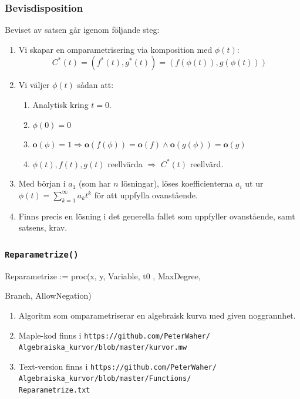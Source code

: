 \documentclass{beamer}
\begin{document}
\begin{frame}
	\frametitle{Bevisdisposition}
	Beviset av satsen går igenom följande steg:
	
	\begin{enumerate}
		\item<1-> Vi skapar en omparametrisering via komposition med $\phi(t)$:
		\[C^*(t) = (f^*(t), g^*(t)) = (f(\phi(t)), g(\phi(t)))\]
		
		\item<2-> Vi väljer $\phi(t)$ sådan att:
		\begin{enumerate}
			\item<3-> Analytisk kring $t = 0$.
			
			\item<4-> $\phi(0)=0$
			
			\item<5-> $\mathbf{o}(\phi)=1 \Longrightarrow \mathbf{o}(f(\phi))=\mathbf{o}(f) \wedge \mathbf{o}(g(\phi))=\mathbf{o}(g)$
			
			\item<6-> $\phi(t), f(t), g(t)$ reellvärda $\Longrightarrow$ $C^*(t)$ reellvärd.
			
		\end{enumerate}
		
		\item<7-> Med början i $a_1$ (som har $n$ lösningar), löses koefficienterna $a_i$ ut ur $\phi(t)=\sum_{k=1}^{\infty}a_k t^k$ för att uppfylla ovanstående.
		
		\item<8-> Finns precis en lösning i det generella fallet som uppfyller ovanstående, samt satsens, krav.
		
	\end{enumerate}
\end{frame}

\begin{frame}
	\frametitle{\texttt{Reparametrize()}}

\begin{semiverbatim}
Reparametrize := proc(x, y, Variable, t0 , MaxDegree,

\qquad Branch, AllowNegation)
\end{semiverbatim}
	
	\begin{enumerate}
		\item<1-> Algoritm som omparametriserar en algebraisk kurva med given noggrannhet.
		
		\item<2-> Maple-kod finns i \texttt{https://github.com/PeterWaher/\\
			\qquad Algebraiska\_kurvor/blob/master/kurvor.mw}
		
		\item<3-> Text-version finns i
		\texttt{https://github.com/PeterWaher/\\
			\qquad Algebraiska\_kurvor/blob/master/Functions/\\
			\qquad Reparametrize.txt} 
	\end{enumerate}
\end{frame}
\end{document}

